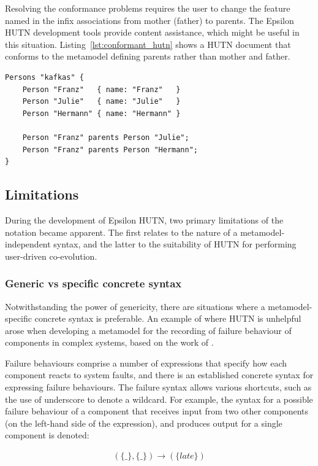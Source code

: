Resolving the conformance problems requires the user to change the feature named in the infix associations from mother (father) to parents. The Epsilon HUTN development tools provide content assistance, which might be useful in this situation. Listing~\ref{lst:conformant_hutn} shows a HUTN document that conforms to the metamodel defining parents rather than mother and father.

\begin{lstlisting}[caption=HUTN for people with parents., label=lst:conformant_hutn, language=HutnFamilies]
Persons "kafkas" {
    Person "Franz"   { name: "Franz"   }
    Person "Julie"   { name: "Julie"   }
    Person "Hermann" { name: "Hermann" }
    
    Person "Franz" parents Person "Julie";
    Person "Franz" parents Person "Hermann";
}
\end{lstlisting}


\subsection{Limitations}
During the development of Epsilon HUTN, two primary limitations of the notation became apparent. The first relates to the nature of a metamodel-independent syntax, and the latter to the suitability of HUTN for performing user-driven co-evolution.

\subsubsection{Generic vs specific concrete syntax}
Notwithstanding the power of genericity, there are situations where a metamodel-specific concrete syntax is preferable. An example of where HUTN is unhelpful arose when developing a metamodel for the recording of failure behaviour of components in complex systems, based on the work of \cite{wallace05modular}.

Failure behaviours comprise a number of expressions that specify how each component reacts to system faults, and there is an established concrete syntax for expressing failure behaviours. The failure syntax allows various shortcuts, such as the use of underscore to denote a wildcard. For example, the syntax for a possible failure behaviour of a component that receives input from two other components (on the left-hand side of the expression), and produces output for a single component is denoted:

\begin{eqnarray}\label{failure}
(\{\_\}, \{\_\}) \rightarrow (\{late\})
\end{eqnarray}

